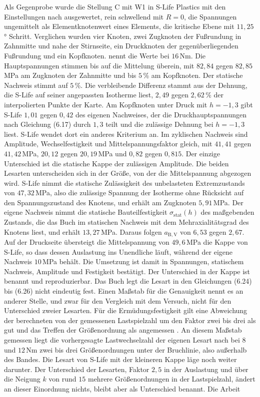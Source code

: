 Als Gegenprobe wurde die Stellung C mit W1 in S-Life Plastics mit den Einstellungen nach  ausgewertet, rein schwellend mit $R = 0$, die Spannungen ungemittelt als Elementknotenwert eines Elements, die kritische Ebene mit $11{,}25$° Schritt. Verglichen wurden vier Knoten, zwei Zugknoten der Fußrundung in Zahnmitte und nahe der Stirnseite, ein Druckknoten der gegenüberliegenden Fußrundung und ein Kopfknoten.  nennt die Werte bei $16$\,Nm. Die Hauptspannungen stimmen bis auf die Mittelung überein, mit $82{,}84$ gegen $82{,}85$\,MPa am Zugknoten der Zahnmitte und bis $5$\,\% am Kopfknoten. Der statische Nachweis stimmt auf $5$\,\%. Die verbleibende Differenz stammt aus der Dehnung, die S-Life auf seiner angepassten Isotherme liest, $2{,}49$ gegen $2{,}62$\,\% der interpolierten Punkte der Karte. Am Kopfknoten unter Druck mit $h = -1{,}3$ gibt S-Life $1{,}01$ gegen $0{,}42$ des eigenen Nachweises, der die Druckhauptspannungen nach Gleichung (6.17) durch $1{,}3$ teilt und die zulässige Dehnung bei $h = -1{,}3$ liest. S-Life wendet dort ein anderes Kriterium an. Im zyklischen Nachweis sind Amplitude, Wechselfestigkeit und Mittelspannungsfaktor gleich, mit $41{,}41$ gegen $41{,}42$\,MPa, $20{,}12$ gegen $20{,}19$\,MPa und $0{,}82$ gegen $0{,}815$. Der einzige Unterschied ist die statische Kappe der zulässigen Amplitude. Die beiden Lesarten unterscheiden sich in der Größe, von der die Mittelspannung abgezogen wird. S-Life nimmt die statische Zulässigkeit des unbelasteten Extremzustands von $47{,}32$\,MPa, also die zulässige Spannung der Isotherme ohne Rücksicht auf den Spannungszustand des Knotens, und erhält am Zugknoten $5{,}91$\,MPa. Der eigene Nachweis nimmt die statische Bauteilfestigkeit $\sigma_{\mathrm{stat}}(h)$ des maßgebenden Zustands, die das Buch im statischen Nachweis mit dem Mehraxialitätsgrad des Knotens liest, und erhält $13{,}27$\,MPa. Daraus folgen $a_{\mathrm{B,V}}$ von $6{,}53$ gegen $2{,}67$. Auf der Druckseite übersteigt die Mittelspannung von $49{,}6$\,MPa die Kappe von S-Life, so dass dessen Auslastung ins Unendliche läuft, während der eigene Nachweis $10$\,MPa behält. Die Umsetzung ist damit in Spannungen, statischem Nachweis, Amplitude und Festigkeit bestätigt. Der Unterschied in der Kappe ist benannt und reproduzierbar. Das Buch legt die Lesart in den Gleichungen (6.24) bis (6.26) \cite[S.~374]{Sto18} nicht eindeutig fest. Einen Maßstab für die Genauigkeit nennt es an anderer Stelle, und zwar für den Vergleich mit dem Versuch, nicht für den Unterschied zweier Lesarten. Für die Ermüdungsfestigkeit gilt eine Abweichung der berechneten von der gemessenen Lastspielzahl um den Faktor zwei bis drei als gut und das Treffen der Größenordnung als angemessen \cite[S.~375]{Sto18}. An diesem Maßstab gemessen liegt die vorhergesagte Lastwechselzahl der eigenen Lesart nach  bei $8$ und $12$\,Nm zwei bis drei Größenordnungen unter der Bruchlinie, also außerhalb des Bandes. Die Lesart von S-Life mit der kleineren Kappe läge noch weiter darunter. Der Unterschied der Lesarten, Faktor $2{,}5$ in der Auslastung und über die Neigung $k$ von rund $15$ mehrere Größenordnungen in der Lastspielzahl, ändert an dieser Einordnung nichts, bleibt aber als Unterschied benannt. Die Arbeit 
